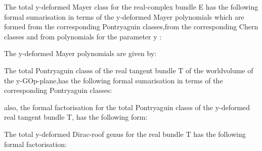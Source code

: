 \documentclass[a4paper,a4paper]{article}
\begin{document}
The total  y-deformed Mayer class for the real-complex  bundle E has the following formal sumarisation in terms of the y-deformed  Mayer polynomials which are formed from the corresponding Pontryaguin classes,from the corresponding Chern classes and from polynomials for the parameter y :
\begin{center}
{  \coordHE{} }
\end{center}
The y-deformed Mayer polynomials are given by:
\begin{center}
{  \coordHE{} }
\end{center}
\begin{center}
{  \coordHE{} }
\end{center}
\begin{center}
{  \coordHE{} }
\end{center}
\begin{center}
{  \coordHE{} }
\end{center}
The total Pontryaguin classs of the real tangent bundle T of the worldvolume of the y-GOp-plane,has the following formal sumarisation in terms of the corresponding Pontryaguin classes: 
\begin{center}
{  \coordHE{} }
\end{center}
also, the formal factorisation for the total Pontryaguin classs of the y-deformed real tangent bundle T,  has the following form:

\begin{center}
{  \coordHE{} }
\end{center}
The total  y-deformed Dirac-roof genus for the real bundle T has the following formal factorisation:

\begin{center}
{  \coordHE{} }
\end{center}
\end{document}
